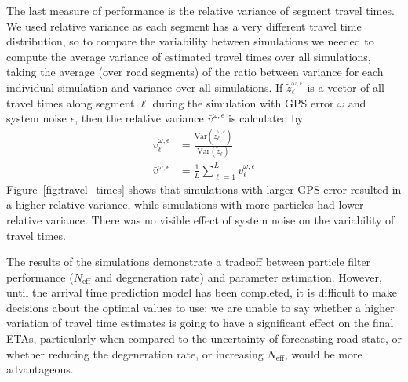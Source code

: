 

The last measure of performance is the relative variance of segment travel times.
We used relative variance as each segment has a very different travel time distribution,
so to compare the variability between simulations we needed to 
compute the average variance of estimated travel times over all simulations,
taking the average (over road segments) of the ratio between variance for
each individual simulation and variance over all simulations.
If $\tilde z_\ell^{\omega,\epsilon}$ is a vector of all travel times
along segment $\ell$ during the simulation with GPS error $\omega$ and system noise $\epsilon$,
then the relative variance $\bar v^{\omega,\epsilon}$ is calculated by
\begin{equation*}
\begin{split}
v_\ell^{\omega,\epsilon} &=
\frac{\mathrm{Var}(\tilde z_\ell^{\omega,\epsilon})}{\mathrm{Var}(\tilde z_\ell)} \\
\bar v^{\omega,\epsilon} &=
    \frac{1}{L}\sum_{\ell=1}^L v_\ell^{\omega,\epsilon}
\end{split}
\end{equation*}
Figure~\ref{fig:travel_times} shows that simulations with larger GPS error
resulted in a higher relative variance,
while simulations with more particles had lower relative variance.
There was no visible effect of system noise on the variability of travel times.


The results of the simulations
demonstrate a tradeoff between particle filter performance
($N_\text{eff}$ and degeneration rate) and parameter estimation.
However, until the arrival time prediction model has been completed,
it is difficult to make decisions about the optimal values to use:
we are unable to say whether a higher variation of travel time estimates
is going to have a significant effect on the final ETAs,
particularly when compared to the uncertainty of forecasting road state,
or whether reducing the degeneration rate, 
or increasing $N_\text{eff}$, would be more advantageous.


